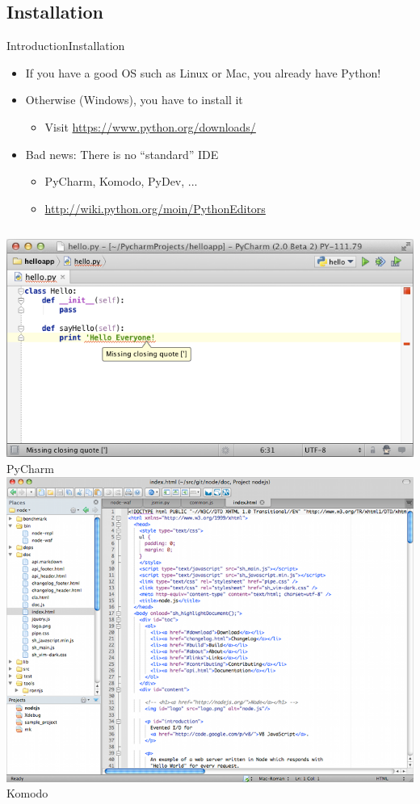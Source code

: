 \documentclass[10pt,compress]{beamer} %
\begin{document}
\subsection{Installation}
\begin{frame}{Introduction}{Installation}
\vspace{-0,3cm}
	\begin{itemize}
		\item If you have a good OS such as Linux or Mac, you already have Python!
		\item Otherwise (Windows), you have to install it
			\begin{itemize}
			\item Visit \url{https://www.python.org/downloads/}
			\end{itemize}
		\item Bad news: There is no ``standard'' IDE
			\begin{itemize}
			\item PyCharm, Komodo, PyDev, ...
			\item \url{http://wiki.python.org/moin/PythonEditors}
			\end{itemize}
	\end{itemize}
    \begin{columns}
		\includegraphics[width=\linewidth]{figs/pycharm.png}\\\centering PyCharm
		\includegraphics[width=\linewidth]{figs/komodo.png}\\\centering Komodo

\end{columns}
\end{frame}
\end{document}
